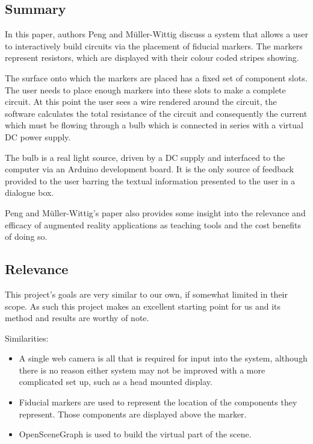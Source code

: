 \subsection{Summary}
In this paper\cite{peng2010understanding}, authors Peng and M\"{u}ller-Wittig discuss a system that allows a user to interactively build circuits via the placement of fiducial markers. The markers represent resistors, which are displayed with their colour coded stripes showing. 

The surface onto which the markers are placed has a fixed set of component slots. The user needs to place enough markers into these slots to make a complete circuit. At this point the user sees a wire rendered around the circuit, the software calculates the total resistance of the circuit and consequently the current which must be flowing through a bulb which is connected in series with a virtual DC power supply.

The bulb is a real light source, driven by a DC supply and interfaced to the computer via an Arduino development board. It is the only source of feedback provided to the user barring the textual information presented to the user in a dialogue box.

Peng and M\"{u}ller-Wittig's paper also provides some insight into the relevance and efficacy of augmented reality applications as teaching tools and the cost benefits of doing so.

\subsection{Relevance}
This project's goals are very similar to our own, if somewhat limited in their scope. As such this project makes an excellent starting point for us and its method and results are worthy of note.



Similarities:
\begin{itemize}
\item A single web camera is all that is required for input into the system, although there is no reason either system may not be improved with a more complicated set up, such as a head mounted display.
\item Fiducial markers are used to represent the location of the components they represent. Those components are displayed above the marker.
\item OpenSceneGraph is used to build the virtual part of the scene.
\end{itemize}

